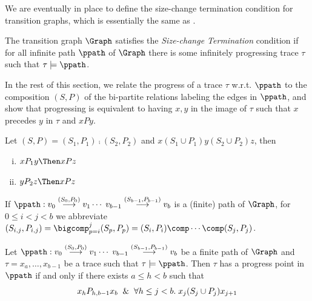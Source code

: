 We are eventually in place to define the size-change termination condition for transition graphs, which is essentially the same as \cite[Def. 2.6]{Lee3}.

\begin{definition}
\label{def:SCT}
The transition graph $\Graph$ satisfies the {\em Size-change Termination} condition 
if for all infinite path $\ppath$ of $\Graph$ there is some infinitely progressing trace $\tau$ 
such that $\tau \models \ppath$.
\end{definition}

In the rest of this section, we relate the progress of a trace $\tau$ w.r.t. $\ppath$ 
to the composition $(S,P)$ of the bi-partite relations labeling the edges in $\ppath$,
and show that progressing is equivalent to having $x, y$ in the image of $\tau$ such that $x$ precedes $y$ in $\tau$ and $x P y$.

\begin{lemma}\label{lem:P-lemma}
Let $(S,P) = (S_1,P_1)\comp (S_2,P_2)$ and $x (S_1 \cup P_1) y (S_2 \cup P_2) z$, then
\begin{enumerate}[i)]

\item
\label{lem:P-lemma-1} $x P_1 y \Then x P z$

\item
\label{lem:P-lemma-2} $y P_2 z \Then x P z$

\end{enumerate}
\end{lemma}


If $\ppath: v_0 \stackrel{(S_0,P_0)}{\longrightarrow} v_1 \cdots \; v_{b-1} \stackrel{(S_{b-1},P_{b-1})}{\longrightarrow} v_{b}$ is a (finite) path of $\Graph$, for $0 \leq i < j < b$
we abbreviate $(S_{i,j}, P_{i,j}) = \bigcomp_{p = i}^{j} (S_p,P_p) = (S_i,P_i) \comp \cdots \comp (S_j,P_j)$. 


\begin{proposition}\label{prop:progresing-and-P}
Let $\ppath: v_0 \stackrel{(S_0,P_0)}{\longrightarrow} v_1 \cdots \; v_{b-1} \stackrel{(S_{b-1},P_{b-1})}{\longrightarrow} v_{b}$ be a finite path of $\Graph$
and $\tau = x_a, \ldots , x_{b-1}$ be a trace such that $\tau \models \ppath$. Then $\tau$ has a progress point in $\ppath$ if and only if
there exists $a \leq h < b$ such that
\[x_h P_{h,b-1} x_b \And \forall h \leq j < b.\; x_j (S_j \cup P_j) x_{j+1}\]
\end{proposition}


